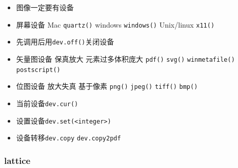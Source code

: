 \documentclass[]{book}
\providecommand{\tightlist}{%
  \setlength{\itemsep}{0pt}\setlength{\parskip}{0pt}}
\begin{document}
\begin{itemize}
  \begin{itemize}
  \tightlist
  \item
    图像一定要有设备
  \item
    屏幕设备 Mac \texttt{quartz()} windows \texttt{windows()} Unix/linux \texttt{x11()}
  \item
    先调用后用\texttt{dev.off()}关闭设备
  \item
    矢量图设备 保真放大 元素过多体积庞大 \texttt{pdf()} \texttt{svg()} \texttt{winmetafile()} \texttt{postscript()}
  \item
    位图设备 放大失真 基于像素 \texttt{png()} \texttt{jpeg()} \texttt{tiff()} \texttt{bmp()}
  \item
    当前设备\texttt{dev.cur()}
  \item
    设置设备\texttt{dev.set(\textless{}integer\textgreater{})}
  \item
    设备转移\texttt{dev.copy} \texttt{dev.copy2pdf}
  \end{itemize}
\end{itemize}

\hypertarget{lattice}{%
\subsubsection{lattice}\label{lattice}}
\end{document}

